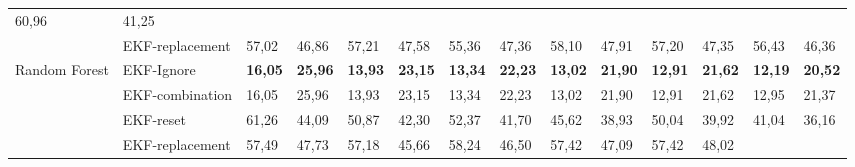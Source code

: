 \documentclass[letterpaper, 10 pt, conference]{ieeeconf}  %
\begin{document}
\begin{table*}[]
\begin{tabular}{@{}llllllllllllll@{}}
		\multicolumn{1}{l|}{60,96} &
		\multicolumn{1}{l|}{41,25} \\ \cmidrule(l){2-14} 
		\multicolumn{1}{|l|}{} &
		\multicolumn{1}{l|}{EKF-replacement} &
		\multicolumn{1}{l|}{57,02} &
		\multicolumn{1}{l|}{46,86} &
		\multicolumn{1}{l|}{57,21} &
		\multicolumn{1}{l|}{47,58} &
		\multicolumn{1}{l|}{55,36} &
		\multicolumn{1}{l|}{47,36} &
		\multicolumn{1}{l|}{58,10} &
		\multicolumn{1}{l|}{47,91} &
		\multicolumn{1}{l|}{57,20} &
		\multicolumn{1}{l|}{47,35} &
		\multicolumn{1}{l|}{56,43} &
		\multicolumn{1}{l|}{46,36} \\ \midrule
		\multicolumn{1}{|l|}{\multirow{4}{*}{Random Forest}} &
		\multicolumn{1}{l|}{EKF-Ignore} &
		\multicolumn{1}{l|}{\textbf{16,05}} &
		\multicolumn{1}{l|}{\textbf{25,96}} &
		\multicolumn{1}{l|}{\textbf{13,93}} &
		\multicolumn{1}{l|}{\textbf{23,15}} &
		\multicolumn{1}{l|}{\textbf{13,34}} &
		\multicolumn{1}{l|}{\textbf{22,23}} &
		\multicolumn{1}{l|}{\textbf{13,02}} &
		\multicolumn{1}{l|}{\textbf{21,90}} &
		\multicolumn{1}{l|}{\textbf{12,91}} &
		\multicolumn{1}{l|}{\textbf{21,62}} &
		\multicolumn{1}{l|}{\textbf{12,19}} &
		\multicolumn{1}{l|}{\textbf{20,52}} \\ \cmidrule(l){2-14} 
		\multicolumn{1}{|l|}{} &
		\multicolumn{1}{l|}{EKF-combination} &
		\multicolumn{1}{l|}{16,05} &
		\multicolumn{1}{l|}{25,96} &
		\multicolumn{1}{l|}{13,93} &
		\multicolumn{1}{l|}{23,15} &
		\multicolumn{1}{l|}{13,34} &
		\multicolumn{1}{l|}{22,23} &
		\multicolumn{1}{l|}{13,02} &
		\multicolumn{1}{l|}{21,90} &
		\multicolumn{1}{l|}{12,91} &
		\multicolumn{1}{l|}{21,62} &
		\multicolumn{1}{l|}{12,95} &
		\multicolumn{1}{l|}{21,37} \\ \cmidrule(l){2-14} 
		\multicolumn{1}{|l|}{} &
		\multicolumn{1}{l|}{EKF-reset} &
		\multicolumn{1}{l|}{61,26} &
		\multicolumn{1}{l|}{44,09} &
		\multicolumn{1}{l|}{50,87} &
		\multicolumn{1}{l|}{42,30} &
		\multicolumn{1}{l|}{52,37} &
		\multicolumn{1}{l|}{41,70} &
		\multicolumn{1}{l|}{45,62} &
		\multicolumn{1}{l|}{38,93} &
		\multicolumn{1}{l|}{50,04} &
		\multicolumn{1}{l|}{39,92} &
		\multicolumn{1}{l|}{41,04} &
		\multicolumn{1}{l|}{36,16} \\ \cmidrule(l){2-14} 
		\multicolumn{1}{|l|}{} &
		\multicolumn{1}{l|}{EKF-replacement} &
		\multicolumn{1}{l|}{57,49} &
		\multicolumn{1}{l|}{47,73} &
		\multicolumn{1}{l|}{57,18} &
		\multicolumn{1}{l|}{45,66} &
		\multicolumn{1}{l|}{58,24} &
		\multicolumn{1}{l|}{46,50} &
		\multicolumn{1}{l|}{57,42} &
		\multicolumn{1}{l|}{47,09} &
		\multicolumn{1}{l|}{57,42} &
		\multicolumn{1}{l|}{48,02} &

\end{tabular}
\end{table*}
\end{document}
